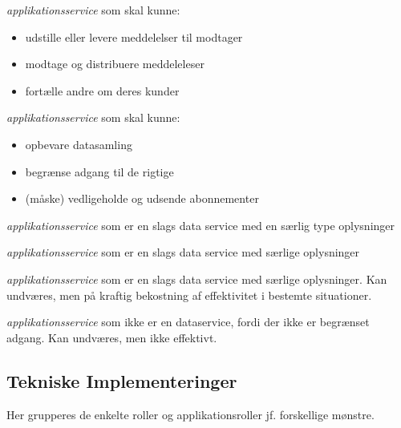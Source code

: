 \begin{description}
\tightlist
\item[eDelivery Service Provider]
\emph{applikationsservice} som skal kunne:
\end{description}

\begin{itemize}
\tightlist
\item
  udstille eller levere meddelelser til modtager
\item
  modtage og distribuere meddeleleser
\item
  fortælle andre om deres kunder
\end{itemize}

\begin{description}
\tightlist
\item[Dataservice]
\emph{applikationsservice} som skal kunne:
\end{description}

\begin{itemize}
\tightlist
\item
  opbevare datasamling
\item
  begrænse adgang til de rigtige
\item
  (måske) vedligeholde og udsende abonnementer
\end{itemize}

\begin{description}
\tightlist
\item[Kontaktregister]
\emph{applikationsservice} som er en slags data service med en særlig
type oplysninger
\item[Log]
\emph{applikationsservice} som er en slags data service med særlige
oplysninger
\item[Indeks]
\emph{applikationsservice} som er en slags data service med særlige
oplysninger. Kan undværes, men på kraftig bekostning af effektivitet i
bestemte situationer.
\item[Katalog]
\emph{applikationsservice} som ikke er en dataservice, fordi der ikke er
begrænset adgang. Kan undværes, men ikke effektivt.
\end{description}

\subsection{Tekniske Implementeringer}\label{tekniske-implementeringer}

Her grupperes de enkelte roller og applikationsroller jf. forskellige
mønstre.

